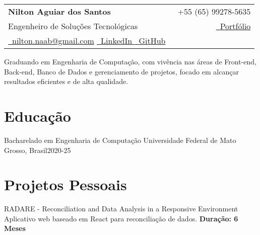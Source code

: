 

\newcommand{\name}{Nilton Aguiar dos Santos} %
\newcommand{\course}{Engenharia de Computação} %
\newcommand{\phone}{+55 (65) 99278-5635} %
\newcommand{\emaila}{nilton.naab@gmail.com} %
\newcommand{\github}{https://github.com/notNilton} %
\newcommand{\linkedin}{https://www.linkedin.com/in/notnilton/} %
\newcommand{\portifolio}{https://github.com/notNilton} %




{
\begin{tabularx}{\linewidth}{L r}                                                               \\
    \textbf{\Large \name} & {\raisebox{0.0\height}{\footnotesize \faPhone}\ \phone}
    \\
    {Engenheiro de Soluções Tecnológicas}
                          &
    \href{\portifolio}{\raisebox{0.0\height}{\footnotesize \faGlobe}\ {Portfólio}}
    \\
    \href{mailto:\emaila} {\raisebox{0.0\height}{\footnotesize \faEnvelope}\ {\emaila}}
    \href{\linkedin}{\raisebox{0.0\height}{\footnotesize \faLinkedin}\ {LinkedIn} }
    \href{\github}{\raisebox{0.0\height}{\footnotesize \faGithub}\ {GitHub} }
\end{tabularx}
}
\vspace{1mm}

Graduando em Engenharia de Computação, com vivência nas áreas de Front-end,
Back-end, Banco de Dados e gerenciamento de projetos, focado em alcançar
resultados eficientes e de alta qualidade.

\section{\textbf{Educação}}
\resumeSubHeadingListStart
\resumeSubheading
{Bacharelado em Engenharia de Computação}{}
{Universidade Federal de Mato Grosso, Brasil}{2020-25}
\resumeSubHeadingListEnd
\vspace{-5.5mm}

\section{\textbf{Projetos Pessoais}}
\resumeSubHeadingListStart
\resumeProject
{ RADARE - \textmd{Reconciliation and Data Analysis in a Responsive Environment}}
{Aplicativo web baseado em React para reconciliação de dados.}
{\textbf{Duração: 6 Meses}}

